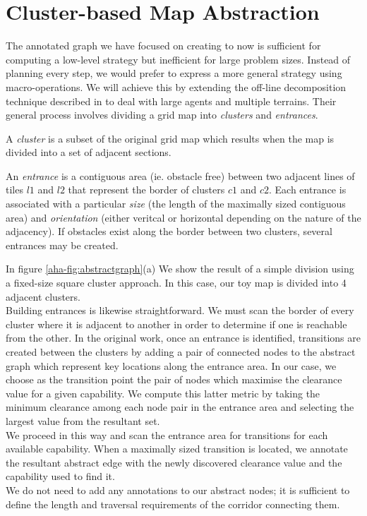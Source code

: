 \section{Cluster-based Map Abstraction}
\label{aha:mapabstraction}
The annotated graph we have focused on creating to now is sufficient for computing a low-level strategy but inefficient for large problem sizes. 
Instead of planning every step, we would prefer to express a more general strategy using macro-operations.
We will achieve this by extending the off-line decomposition technique described in \cite{botea04} to deal with large agents and multiple terrains. Their general process involves dividing a grid map into \emph{clusters} and \emph{entrances}. 
\begin{definition}
A \emph{cluster} is a subset of the original grid map which results when the map is divided into a set of adjacent sections. 
\end{definition}

\begin{definition}
An \emph{entrance} is a contiguous area (ie. obstacle free) between two adjacent lines of tiles $l1$ and $l2$ that represent the border of clusters $c1$ and $c2$. 
Each entrance is associated with a particular \emph{size} (the length of the maximally sized contiguous area) and \emph{orientation} (either veritcal or horizontal depending on the nature of the adjacency). If obstacles exist along the border between two clusters, several entrances may be created.
\end{definition}

In figure \ref{aha-fig:abstractgraph}(a) We show the result of a simple division using a fixed-size square cluster approach. In this case, our toy map is divided into 4 adjacent clusters. \\ \newline
Building entrances is likewise straightforward. We must scan the border of every cluster where it is adjacent to another in order to determine if one is reachable from the other. In the original work, once an entrance is identified, transitions are created between the clusters by adding a pair of connected nodes to the abstract graph which represent key locations along the entrance area. In our case, we choose as the transition point the pair of nodes which maximise the clearance value for a given capability. We compute this latter metric by taking the minimum clearance among each node pair in the entrance area and selecting the largest value from the resultant set. \\ \newline
We proceed in this way and scan the entrance area for transitions for each available capability. When a maximally sized transition is located, we annotate the resultant abstract edge with the newly discovered clearance value and the capability used to find it. \\
We do not need to add any annotations to our abstract nodes; it is sufficient to define the length and traversal requirements of the corridor connecting them.  

